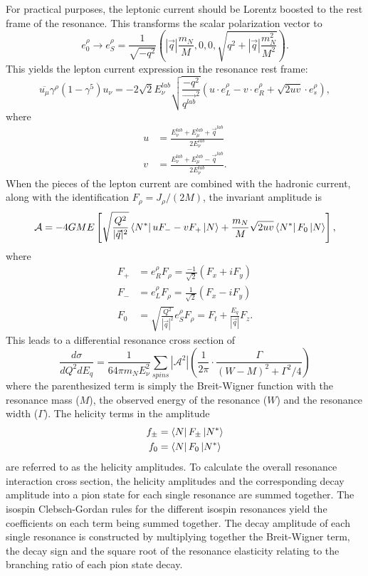 For practical purposes, the leptonic current should be Lorentz boosted to the rest frame of the resonance. This transforms the scalar polarization vector to 
\begin{equation}
e^\rho_0 \rightarrow e^\rho_S= \frac{1}{\sqrt{-q^2}}(|\vec{q}|\frac{m_N}{M}, 0, 0, \sqrt{q^2+|\vec{q}|\frac{m_N^2}{M^2}}).
\end{equation}
This yields the lepton current expression in the resonance rest frame:
\begin{equation}
\overline{u_\mu} \gamma^\rho(1-\gamma^5) u_\nu = -2\sqrt{2}E^{lab}_\nu\sqrt{\frac{-q^2}{\vec{q^{lab}}^2}}(u\cdot e^\rho_L - v\cdot e^\rho_R + \sqrt{2uv}\cdot e^\rho_s),
\end{equation}
where
\begin{align}
u &= \frac{E_\nu^{lab}+E_\mu^{lab}+\vec{q}^{lab}}{2E^{lab}_\nu}\\
v &= \frac{E^{lab}_\nu+E^{lab}_\mu-\vec{q}^{lab}}{2E^{lab}_\nu}.
\end{align}
When the pieces of the lepton current are combined with the hadronic current, along with the identification $F_\rho = J_\rho/(2M)$, the invariant amplitude is
\begin{equation}
\mathcal{A} = -4GME\left[\sqrt{\frac{Q^2}{|\vec{q}|^2}} \bra{N^*} uF_- - vF_+ \ket{N} + \frac{m_N}{M}\sqrt{2uv}\bra{N^*}F_0\ket{N}\right],
\end{equation}
where
\begin{align}
F_+ &= e^\rho_R F_\rho = \frac{-1}{\sqrt{2}}(F_x+iF_y)\\
F_- &= e^\rho_L F_\rho = \frac{1}{\sqrt{2}}(F_x-iF_y)\\
F_0 &= \sqrt{\frac{Q^2}{|\vec{q}|^2}}e^\rho_S F_\rho = F_t+\frac{E_q}{|\vec{q}|}F_z.
\end{align}
This leads to a differential resonance cross section of
\begin{equation}
\frac{d\sigma}{dQ^2 dE_q} = \frac{1}{64\pi m_N E_\nu^2} \sum_{spins} |\mathcal{A}^2| \left(\frac{1}{2\pi}\cdot\frac{\Gamma}{(W-M)^2+\Gamma^2/4}\right)
\end{equation}
where the parenthesized term is simply the Breit-Wigner function with the resonance mass ($M$), the observed energy of the resonance ($W$) and the resonance width ($\Gamma$). The helicity terms in the amplitude
\begin{align}
f_{\pm} &= \bra{N}F_{\pm}\ket{N^*}\\
f_{0} &= \bra{N}F_{0}\ket{N^*}
\end{align}
are referred to as the helicity amplitudes. To calculate the overall resonance interaction cross section, the helicity amplitudes and the corresponding decay amplitude into a pion state for each single resonance are summed together. The isospin Clebsch-Gordan rules for the different isospin resonances yield the coefficients on each term being summed together. The decay amplitude of each single resonance is constructed by multiplying together the Breit-Wigner term, the decay sign and the square root of the resonance elasticity relating to the branching ratio of each pion state decay. 

